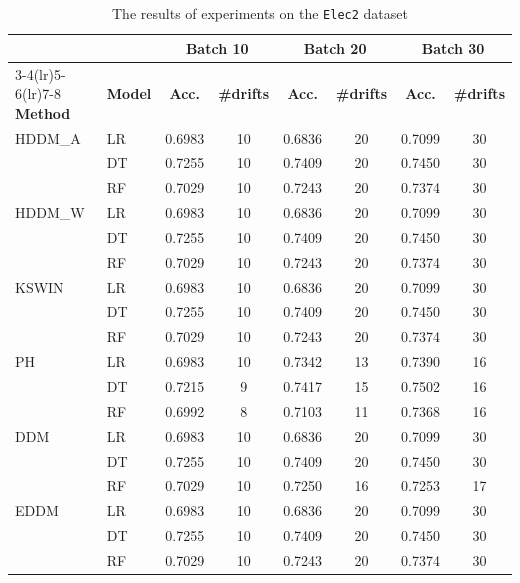 \begin{table}[h]
    \centering
    \scriptsize
    \caption{The results of experiments on the \texttt{Elec2} dataset}
    \label{tab:exp_Elec2}
    \begin{tabular}{llcccccc}\toprule
         & & \multicolumn{2}{c}{Batch 10} & \multicolumn{2}{c}{Batch 20} & \multicolumn{2}{c}{Batch 30} \\\cmidrule(lr){3-4}\cmidrule(lr){5-6}\cmidrule(lr){7-8}
         \textbf{Method} & \textbf{Model} & \textbf{Acc.} & \textbf{\#drifts} & \textbf{Acc.} & \textbf{\#drifts} & \textbf{Acc.} & \textbf{\#drifts} \\\midrule
    HDDM\_A  & LR & 0.6983 & 10 & 0.6836 & 20 & 0.7099 & 30 \\
             & DT & 0.7255 & 10 & 0.7409 & 20 & 0.7450 & 30 \\
             & RF & 0.7029 & 10 & 0.7243 & 20 & 0.7374 & 30 \\
    \midrule
    HDDM\_W  & LR & 0.6983 & 10 & 0.6836 & 20 & 0.7099 & 30 \\
             & DT & 0.7255 & 10 & 0.7409 & 20 & 0.7450 & 30 \\
             & RF & 0.7029 & 10 & 0.7243 & 20 & 0.7374 & 30 \\
    \midrule
    KSWIN    & LR & 0.6983 & 10 & 0.6836 & 20 & 0.7099 & 30 \\
             & DT & 0.7255 & 10 & 0.7409 & 20 & 0.7450 & 30 \\
             & RF & 0.7029 & 10 & 0.7243 & 20 & 0.7374 & 30 \\
    \midrule
    PH       & LR & 0.6983 & 10 & 0.7342 & 13 & 0.7390 & 16 \\
             & DT & 0.7215 & 9 & 0.7417 & 15 & 0.7502 & 16 \\
             & RF & 0.6992 & 8 & 0.7103 & 11 & 0.7368 & 16 \\
    \midrule
    DDM      & LR & 0.6983 & 10 & 0.6836 & 20 & 0.7099 & 30 \\
             & DT & 0.7255 & 10 & 0.7409 & 20 & 0.7450 & 30 \\
             & RF & 0.7029 & 10 & 0.7250 & 16 & 0.7253 & 17 \\
    \midrule
    EDDM     & LR & 0.6983 & 10 & 0.6836 & 20 & 0.7099 & 30 \\
             & DT & 0.7255 & 10 & 0.7409 & 20 & 0.7450 & 30 \\
             & RF & 0.7029 & 10 & 0.7243 & 20 & 0.7374 & 30 \\

\end{tabular}
\end{table}

